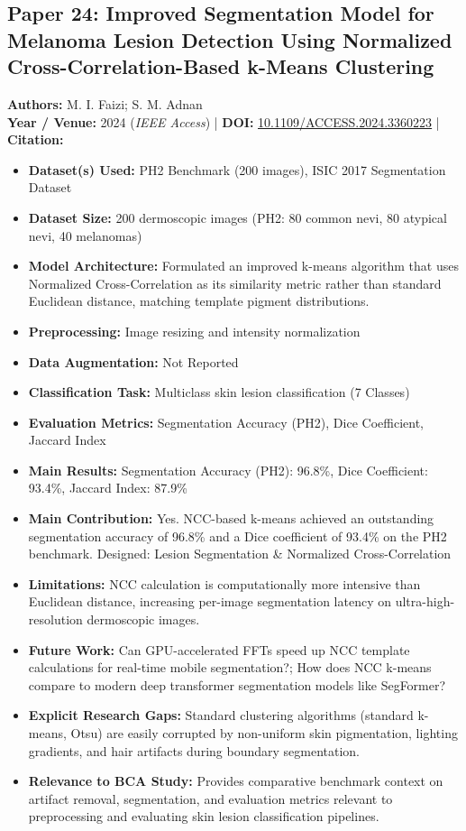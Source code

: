 \documentclass[11pt,a4paper]{article}
\begin{document}
\subsection{Paper 24: Improved Segmentation Model for Melanoma Lesion Detection Using Normalized Cross-Correlation-Based k-Means Clustering}
\textbf{Authors:} M. I. Faizi; S. M. Adnan \\
\textbf{Year / Venue:} 2024 (\textit{IEEE Access}) | \textbf{DOI:} \href{https://doi.org/10.1109/ACCESS.2024.3360223}{10.1109/ACCESS.2024.3360223} | \textbf{Citation:} \cite{10416953}

\begin{itemize}\small
\item \textbf{Dataset(s) Used:} PH2 Benchmark (200 images), ISIC 2017 Segmentation Dataset
\item \textbf{Dataset Size:} 200 dermoscopic images (PH2: 80 common nevi, 80 atypical nevi, 40 melanomas)
\item \textbf{Model Architecture:} Formulated an improved k-means algorithm that uses Normalized Cross-Correlation as its similarity metric rather than standard Euclidean distance, matching template pigment distributions.
\item \textbf{Preprocessing:} Image resizing and intensity normalization
\item \textbf{Data Augmentation:} Not Reported
\item \textbf{Classification Task:} Multiclass skin lesion classification (7 Classes)
\item \textbf{Evaluation Metrics:} Segmentation Accuracy (PH2), Dice Coefficient, Jaccard Index
\item \textbf{Main Results:} Segmentation Accuracy (PH2): 96.8\%, Dice Coefficient: 93.4\%, Jaccard Index: 87.9\%
\item \textbf{Main Contribution:} Yes. NCC-based k-means achieved an outstanding segmentation accuracy of 96.8\% and a Dice coefficient of 93.4\% on the PH2 benchmark. Designed: Lesion Segmentation \& Normalized Cross-Correlation
\item \textbf{Limitations:} NCC calculation is computationally more intensive than Euclidean distance, increasing per-image segmentation latency on ultra-high-resolution dermoscopic images.
\item \textbf{Future Work:} Can GPU-accelerated FFTs speed up NCC template calculations for real-time mobile segmentation?; How does NCC k-means compare to modern deep transformer segmentation models like SegFormer?
\item \textbf{Explicit Research Gaps:} Standard clustering algorithms (standard k-means, Otsu) are easily corrupted by non-uniform skin pigmentation, lighting gradients, and hair artifacts during boundary segmentation.
\item \textbf{Relevance to BCA Study:} Provides comparative benchmark context on artifact removal, segmentation, and evaluation metrics relevant to preprocessing and evaluating skin lesion classification pipelines.
\end{itemize}
\end{document}
